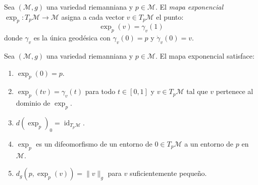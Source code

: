 \begin{definition}\label{def:mapa_exponencial_riemanniano}
Sea $(\mathcal{M}, g)$ una variedad riemanniana y $p \in \mathcal{M}$. El \textit{mapa exponencial} $\exp_p: T_p\mathcal{M} \to \mathcal{M}$ asigna a cada vector $v \in T_p\mathcal{M}$ el punto:
\[
\exp_p(v) = \gamma_v(1)
\]
donde $\gamma_v$ es la única geodésica con $\gamma_v(0) = p$ y $\dot{\gamma}_v(0) = v$.
\end{definition}

\begin{proposition}\label{prop:propiedades_exp}
Sea $(\mathcal{M}, g)$ una variedad riemanniana y $p \in \mathcal{M}$. El mapa exponencial satisface:
\begin{enumerate}
	\item $\exp_p(0) = p$.
	\item $\exp_p(tv) = \gamma_v(t)$ para todo $t \in [0,1]$ y $v \in T_p\mathcal{M}$ tal que $v$ pertenece al dominio de $\exp_p$.
	\item $d(\exp_p)_0 = \operatorname{id}_{T_p\mathcal{M}}$.
	\item $\exp_p$ es un difeomorfismo de un entorno de $0 \in T_p\mathcal{M}$ a un entorno de $p$ en $\mathcal{M}$.
	\item $d_g(p, \exp_p(v)) = \|v\|_g$ para $v$ suficientemente pequeño.
\end{enumerate}
\end{proposition}

